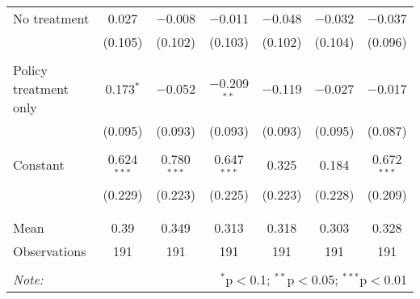 \begin{tabular}{@{\extracolsep{5pt}}lcccccc}
 No treatment & 0.027 & $-$0.008 & $-$0.011 & $-$0.048 & $-$0.032 & $-$0.037 \\ 
  & (0.105) & (0.102) & (0.103) & (0.102) & (0.104) & (0.096) \\ 
  & & & & & & \\ 
 Policy treatment only & 0.173$^{*}$ & $-$0.052 & $-$0.209$^{**}$ & $-$0.119 & $-$0.027 & $-$0.017 \\ 
  & (0.095) & (0.093) & (0.093) & (0.093) & (0.095) & (0.087) \\ 
  & & & & & & \\ 
 Constant & 0.624$^{***}$ & 0.780$^{***}$ & 0.647$^{***}$ & 0.325 & 0.184 & 0.672$^{***}$ \\ 
  & (0.229) & (0.223) & (0.225) & (0.223) & (0.228) & (0.209) \\ 
  & & & & & & \\ 
\hline \\[-1.8ex] 
Mean & 0.39 & 0.349 & 0.313 & 0.318 & 0.303 & 0.328 \\ 
Observations & 191 & 191 & 191 & 191 & 191 & 191 \\ 
\hline 
\hline \\[-1.8ex] 
\textit{Note:}  & \multicolumn{6}{r}{$^{*}$p$<$0.1; $^{**}$p$<$0.05; $^{***}$p$<$0.01} \\ 
\end{tabular} 
